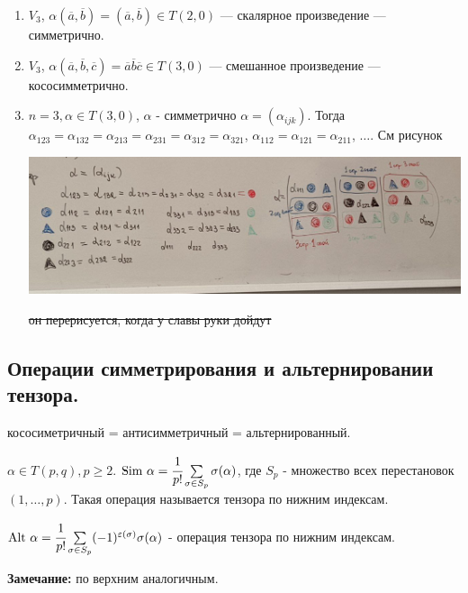 \begin{enumerate}
    \item $V_3$, $\alpha(\overline{a}, \overline{b}) = (\overline{a}, \overline{b})\in T(2,0)$ --- скалярное произведение --- симметрично.
     \item $V_3$, $\alpha(\overline{a}, \overline{b}, \overline{c}) = \overline{a} \overline{b}\overline{c}\in T(3,0)$ --- смешанное произведение --- кососимметрично.
     \item $n =3, \alpha \in T(3,0)$, $\alpha$ - симметрично $\alpha = (\alpha_{ijk})$. Тогда $\alpha_{123}=\alpha_{132}=\alpha_{213}= \alpha_{231} = \alpha_{312} = \alpha_{321}$, $\alpha_{112} = \alpha_{121}  =\alpha_{211}$, $\ldots$. См рисунок

     \begin{center}
         \includegraphics[width = 18cm]{assets/8_4-table.jpg}
     \end{center}
     \sout{он перерисуется, когда у славы руки дойдут}
\end{enumerate}

\subsection{Операции симметрирования и альтернировании тензора.}

кососиметричный = антисимметричный = альтернированный.

 $\alpha \in T(p,q), p \geq 2$. $\text{Sim } \alpha = \cfrac{1}{p!}\sum\limits_{\sigma \in S_p}\sigma(\alpha)$, где $S_p$ - множество всех перестановок $(1,\ldots, p)$. Такая операция называется  тензора по нижним индексам.

 $\text{Alt } \alpha = \cfrac{1}{p!}\sum\limits_{\sigma \in S_p}(-1)^{\varepsilon(\sigma)}\sigma(\alpha)$ - операция   тензора по нижним индексам.

\textbf{Замечание:} по верхним аналогичным.

